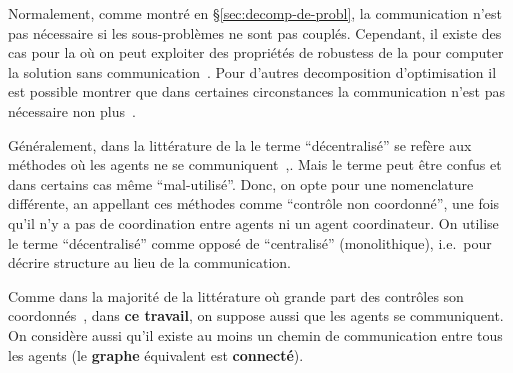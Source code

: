 \documentclass[../main.tex]{subfiles}
\begin{document}
Normalement, comme montré en \S\ref{sec:decomp-de-probl}, la communication n'est pas nécessaire si les sous-problèmes ne sont pas couplés.
Cependant, il existe des cas pour la \dmpc{} où on peut exploiter des propriétés de robustess de la \mpc{} pour computer la solution sans communication~\cite{VahidNaghaviEtAl2014}.
Pour d'autres decomposition d'optimisation il est possible montrer que dans certaines circonstances la communication n'est pas nécessaire non plus~\cite{VoulgarisElia2022}.
\begin{remark}
  Généralement, dans la littérature de la \dmpc{} le terme ``décentralisé'' se refère aux méthodes où les agents ne se communiquent~\cite[\S 4]{ChristofidesEtAl2013},\cite{NegenbornMaestre2014}.
  Mais le terme peut être confus et dans certains cas même ``mal-utilisé''.
  Donc, on opte pour une nomenclature différente, an appellant ces méthodes comme ``contrôle non coordonné'', une fois qu'il n'y a pas de coordination entre agents ni un agent coordinateur.
  On utilise le terme ``décentralisé'' comme opposé de ``centralisé'' (monolithique), i.e.\ pour décrire structure au lieu de la communication.
\end{remark}

Comme dans la majorité de la littérature où grande part des contrôles son coordonnés~\cite{NegenbornMaestre2014, ArauzEtAl2021}, dans \textbf{ce travail}, on suppose aussi que les agents se communiquent.
On considère aussi qu'il existe au moins un chemin de communication entre tous les agents (le \textbf{graphe} équivalent est \textbf{connecté}).
\end{document}

